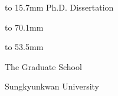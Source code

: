 \begin{center}
\vbox to 15.7mm {
\vfill
\fontsize{16pt}{16pt}\selectfont Ph.D. Dissertation
}
\nointerlineskip

\vspace{15.5mm}

\vbox to 70.1mm {
\vspace{0.5mm}
\vspace{8.4pt}
\fontsize{22pt}{22pt}\selectfont\thesistitle{}
\vfill
}
\nointerlineskip

\vbox to 53.5mm {
\vspace{0.5mm}
\vspace{7.2pt}
\fontsize{16pt}{16pt}\selectfont\studentname{}
\vfill
}
\nointerlineskip

\vspace{0.5mm}
\setlength{\parskip}{7.2pt}
\fontsize{16pt}{16pt}\selectfont
\departmentname{}\par
The Graduate School\par
Sungkyunkwan University\par
\end{center}
